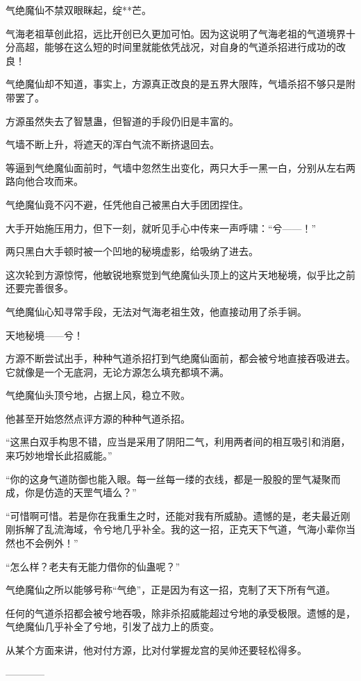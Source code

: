 \begin{this_body}
气绝魔仙不禁双眼眯起，绽**芒。

气海老祖草创此招，远比开创已久更加可怕。因为这说明了气海老祖的气道境界十分高超，能够在这么短的时间里就能依凭战况，对自身的气道杀招进行成功的改良！

气绝魔仙却不知道，事实上，方源真正改良的是五界大限阵，气墙杀招不够只是附带罢了。

方源虽然失去了智慧蛊，但智道的手段仍旧是丰富的。

气墙不断上升，将遮天的浑白气流不断挤退回去。

等逼到气绝魔仙面前时，气墙中忽然生出变化，两只大手一黑一白，分别从左右两路向他合攻而来。

气绝魔仙竟不闪不避，任凭他自己被黑白大手团团捏住。

大手开始施压用力，但下一刻，就听见手心中传来一声呼啸：“兮——！”

两只黑白大手顿时被一个凹地的秘境虚影，给吸纳了进去。

这次轮到方源惊愕，他敏锐地察觉到气绝魔仙头顶上的这片天地秘境，似乎比之前还要完善很多。

气绝魔仙心知寻常手段，无法对气海老祖生效，他直接动用了杀手锏。

天地秘境——兮！

方源不断尝试出手，种种气道杀招打到气绝魔仙面前，都会被兮地直接吞吸进去。它就像是一个无底洞，无论方源怎么填充都填不满。

气绝魔仙头顶兮地，占据上风，稳立不败。

他甚至开始悠然点评方源的种种气道杀招。

“这黑白双手构思不错，应当是采用了阴阳二气，利用两者间的相互吸引和消磨，来巧妙地增长此招威能。”

“你的这身气道防御也能入眼。每一丝每一缕的衣线，都是一股股的罡气凝聚而成，你是仿造的天罡气墙么？”

“可惜啊可惜。若是你在我重生之时，还能对我有所威胁。遗憾的是，老夫最近刚刚拆解了乱流海域，令兮地几乎补全。我的这一招，正克天下气道，气海小辈你当然也不会例外！”

“怎么样？老夫有无能力借你的仙蛊呢？”

气绝魔仙之所以能够号称“气绝”，正是因为有这一招，克制了天下所有气道。

任何的气道杀招都会被兮地吞吸，除非杀招威能超过兮地的承受极限。遗憾的是，气绝魔仙几乎补全了兮地，引发了战力上的质变。

从某个方面来讲，他对付方源，比对付掌握龙宫的吴帅还要轻松得多。

------------

\end{this_body}

